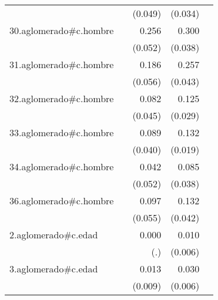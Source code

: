 {\begin{longtable}{l*{4}{D{.}{.}{-1}}}
            &                     &     (0.049)         &     (0.034)         &                     \\
\addlinespace
30.aglomerado#c.hombre&                     &       0.256\sym{***}&       0.300\sym{***}&                     \\
            &                     &     (0.052)         &     (0.038)         &                     \\
\addlinespace
31.aglomerado#c.hombre&                     &       0.186\sym{***}&       0.257\sym{***}&                     \\
            &                     &     (0.056)         &     (0.043)         &                     \\
\addlinespace
32.aglomerado#c.hombre&                     &       0.082         &       0.125\sym{***}&                     \\
            &                     &     (0.045)         &     (0.029)         &                     \\
\addlinespace
33.aglomerado#c.hombre&                     &       0.089\sym{*}  &       0.132\sym{***}&                     \\
            &                     &     (0.040)         &     (0.019)         &                     \\
\addlinespace
34.aglomerado#c.hombre&                     &       0.042         &       0.085\sym{*}  &                     \\
            &                     &     (0.052)         &     (0.038)         &                     \\
\addlinespace
36.aglomerado#c.hombre&                     &       0.097         &       0.132\sym{**} &                     \\
            &                     &     (0.055)         &     (0.042)         &                     \\
\addlinespace
2.aglomerado#c.edad&                     &       0.000         &       0.010         &                     \\
            &                     &         (.)         &     (0.006)         &                     \\
\addlinespace
3.aglomerado#c.edad&                     &       0.013         &       0.030\sym{***}&                     \\
            &                     &     (0.009)         &     (0.006)         &                     \\

\end{longtable}}
